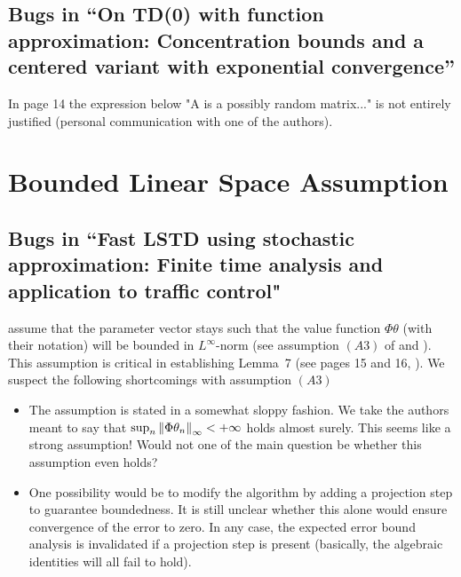 \documentclass{article}
\begin{document}
\subsection{Bugs in ``On TD(0) with function approximation: Concentration bounds and a centered variant with exponential convergence''}
In page 14 the expression below "A is a possibly random matrix..." is not entirely justified (personal communication with one of the authors). 

\section{Bounded Linear Space Assumption}
\subsection{Bugs in ``Fast LSTD using stochastic approximation: Finite time analysis and application to traffic control"}
\citet{flstda} assume that the parameter vector stays such that the value function $\Phi \theta$ (with their notation) will be bounded in $L^\infty$-norm (see assumption \textbf{$(A3)$} of \cite{flstd} and \cite{flstda}). This assumption is critical in establishing Lemma~7 (see pages 15 and 16, \cite{flstda}).
We suspect the following shortcomings with assumption \textbf{$(A3)$}
\begin{itemize}
\item The assumption is stated in a somewhat sloppy fashion. We take the authors meant to say that $\sup_n \left\| \Phi \theta_n\right\|_\infty<+\infty$ holds almost surely. This seems like a strong assumption! Would not one of the main question be whether this assumption even holds?
\item One possibility would be to modify the algorithm by adding a projection step to guarantee boundedness.
It is still unclear  whether this alone would ensure convergence of the error to zero. In any case, the expected error bound analysis is invalidated if a projection step is present (basically, the algebraic identities will all fail to hold).

\end{itemize}
\end{document}
